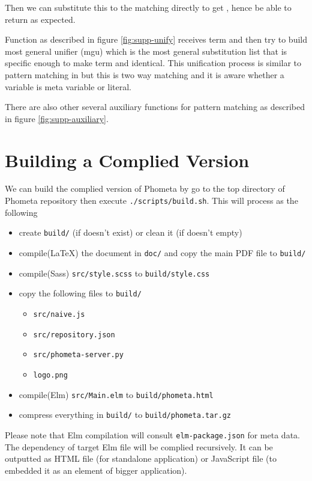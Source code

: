 \documentclass[master.tex]{subfiles}
\begin{document}
Then we can substitute this  to the matching directly to
get , hence be able to return
 as expected.

Function  as described in figure \ref{fig:supp-unify} receives term
 and  then try to build most general unifier (mgu) which is
the most general substitution list that is specific enough to make term
 and  identical. This unification process is similar to
pattern matching in  but this is two way
matching and it is aware whether a variable is meta variable or literal.

There are also other several auxiliary functions for pattern matching as
described in figure \ref{fig:supp-auxiliary}.


\section{Building a Complied Version}
We can build the complied version of Phometa by go to the top directory of
Phometa repository then execute \texttt{./scripts/build.sh}. This will process
as the following
\begin{itemize}
\item create \texttt{build/} (if doesn't exist) or clean it (if doesn't empty)
\item compile(\LaTeX) the document in \texttt{doc/} and copy the main PDF file to \texttt{build/}
\item compile(Sass) \texttt{src/style.scss} to \texttt{build/style.css}
\item copy the following files to \texttt{build/}
  \begin{itemize}
  \item \texttt{src/naive.js}
  \item \texttt{src/repository.json}
  \item \texttt{src/phometa-server.py}
  \item \texttt{logo.png}
  \end{itemize}
\item compile(Elm) \texttt{src/Main.elm} to \texttt{build/phometa.html}
\item compress everything in \texttt{build/} to \texttt{build/phometa.tar.gz}
\end{itemize}

Please note that Elm compilation will consult \texttt{elm-package.json} for meta
data. The dependency of target Elm file will be complied recursively. It can be
outputted as HTML file (for standalone application) or JavaScript file (to
embedded it as an element of bigger application).
\end{document}
